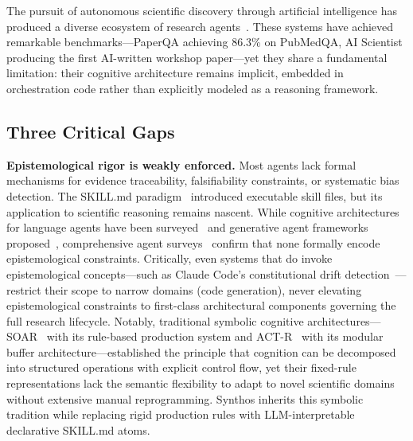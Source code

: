 \documentclass[review]{elsarticle}
\begin{document}
The pursuit of autonomous scientific discovery through artificial intelligence has produced a diverse ecosystem of research agents~\cite{elovic2024gpt,sakana2025ai,shao2024storm,futurehouse2025paperqa2,asai2025openscholar}. These systems have achieved remarkable benchmarks---PaperQA achieving 86.3\% on PubMedQA, AI Scientist producing the first AI-written workshop paper---yet they share a fundamental limitation: their cognitive architecture remains implicit, embedded in orchestration code rather than explicitly modeled as a reasoning framework.

\subsection{Three Critical Gaps}
\label{sec:gaps}

\textbf{Epistemological rigor is weakly enforced.} Most agents lack formal mechanisms for evidence traceability, falsifiability constraints, or systematic bias detection. The SKILL.md paradigm~\cite{hermes2025hermes} introduced executable skill files, but its application to scientific reasoning remains nascent. While cognitive architectures for language agents have been surveyed~\cite{sumers2023cognitive} and generative agent frameworks proposed~\cite{park2023generative}, comprehensive agent surveys~\cite{wang2024surveyagent,xi2023rise} confirm that none formally encode epistemological constraints. Critically, even systems that do invoke epistemological concepts---such as Claude Code's constitutional drift detection~\cite{anthropic2025claude}---restrict their scope to narrow domains (code generation), never elevating epistemological constraints to first-class architectural components governing the full research lifecycle. Notably, traditional symbolic cognitive architectures---SOAR~\cite{laird2012soar} with its rule-based production system and ACT-R~\cite{anderson2004actr} with its modular buffer architecture---established the principle that cognition can be decomposed into structured operations with explicit control flow, yet their fixed-rule representations lack the semantic flexibility to adapt to novel scientific domains without extensive manual reprogramming. Synthos inherits this symbolic tradition while replacing rigid production rules with LLM-interpretable declarative SKILL.md atoms.
\end{document}
